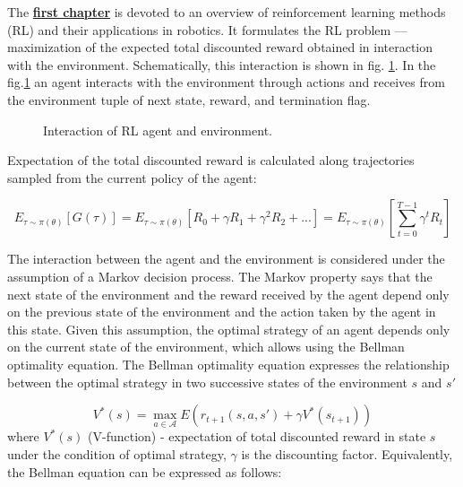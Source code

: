 The \underline{\textbf{first chapter}} is devoted to an overview of reinforcement learning methods (RL) and their applications in robotics. It formulates the RL problem --- maximization of the expected total discounted reward obtained in interaction with the environment. Schematically, this interaction is shown in fig. \ref{fig:rl_setting}. In the fig.\ref{fig:rl_setting} an agent interacts with the environment through actions and receives from the environment tuple of next state, reward, and termination flag. 

\begin{figure}[ht]
    \caption{Interaction of RL agent and environment.}\label{fig:rl_setting}
\end{figure}

Expectation of the total discounted reward is calculated along trajectories sampled from the current policy of the agent:

\[
E_{\tau \sim \pi(\theta)} [G(\tau)] = E_{\tau \sim \pi(\theta)} [R_0 + \gamma R_{1} + \gamma ^ 2 R_{2} + ...] = E_{\tau \sim \pi(\theta)} [\sum_{t=0}^{T - 1} \gamma ^t R_{t}]
\]

The interaction between the agent and the environment is considered under the assumption of a Markov decision process. The Markov property says that the next state of the environment and the reward received by the agent depend only on the previous state of the environment and the action taken by the agent in this state. Given this assumption, the optimal strategy of an agent depends only on the current state of the environment, which allows using the Bellman optimality equation. The Bellman optimality equation expresses the relationship between the optimal strategy in two successive states of the environment $s$ and $s'$

\[
	V^*(s) = \max_{a \in \mathcal{A}} E(r_{t + 1}(s, a, s') + \gamma V^*(s_{t + 1}))
\]
where $V^*(s)$ (V-function) - expectation of total discounted reward in state $s$ under the condition of optimal strategy, $\gamma$ is the discounting factor. Equivalently, the Bellman equation can be expressed as follows: 

